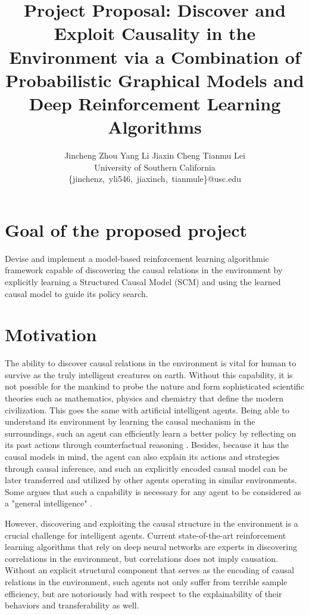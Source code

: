 \documentclass{article}
\title{Project Proposal: Discover and Exploit Causality in the Environment via a Combination of Probabilistic Graphical Models and Deep Reinforcement Learning Algorithms}
\author{%
  Jincheng Zhou \qquad Yang Li \qquad Jiaxin Cheng \qquad Tianmu Lei \vspace{.3em} \\ 
  \large University of Southern California \vspace{.2em}\\ 
  \normalsize
  \{jinchenz,~yli546,~jiaxinch,~tianmule\}@usc.edu 
}
\begin{document}
\maketitle

\section{Goal of the proposed project}
    Devise and implement a model-based reinforcement learning algorithmic framework capable of discovering the causal relations in the environment by explicitly learning a Structured Causal Model (SCM) and using the learned causal model to guide its policy search. 

\section{Motivation}

The ability to discover causal relations in the environment is vital for human to survive as the truly intelligent creatures on earth. Without this capability, it is not possible for the mankind to probe the nature and form sophisticated scientific theories such as mathematics, physics and chemistry that define the modern civilization. This goes the same with artificial intelligent agents. Being able to understand its environment by learning the causal mechanism in the surroundings, such an agent can efficiently learn a better policy by reflecting on its past actions through counterfactual reasoning \cite{buesing2018woulda}. Besides, because it has the causal models in mind, the agent can also explain its actions and strategies through causal inference, and such an explicitly encoded causal model can be later transferred and utilized by other agents operating in similar environments. Some argues that such a capability is necessary for any agent to be considered as a "general intelligence" \cite{Pearl:2018:BWN:3238230}. 

However, discovering and exploiting the causal structure in the environment is a crucial challenge for intelligent agents. Current state-of-the-art reinforcement learning algorithms that rely on deep neural networks are experts in discovering correlations in the environment, but correlations does not imply causation. Without an explicit structural component that serves as the encoding of causal relations in the environment, such agents not only suffer from terrible sample efficiency, but are notoriously bad with respect to the explainability of their behaviors and transferability as well. 
\end{document}
